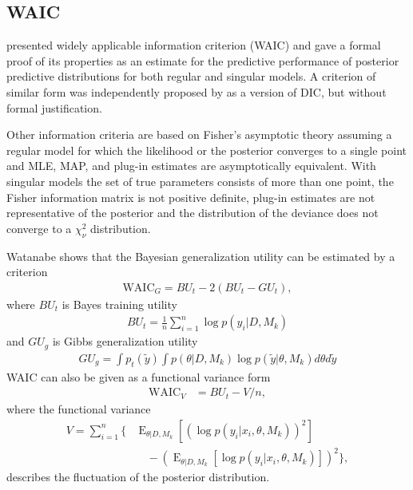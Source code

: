 \documentclass[twoside,11pt]{article}
\def\WAIC{\mathrm{WAIC}}
\DeclareMathOperator{\E}{E}
\begin{document}
\subsection{WAIC}

\citet{Watanabe:2009,Watanabe:2010a,Watanabe:2010d} presented
widely applicable information criterion (WAIC) and gave a formal
proof of its properties as an estimate for the predictive
performance of posterior predictive distributions for both regular
and singular models. A criterion of similar form was independently
proposed by \citet{Richardson:2002} as a version of DIC, but
without formal justification.

Other information criteria are based on Fisher's asymptotic theory
assuming a regular model for which the likelihood or the posterior
converges to a single point and MLE, MAP, and plug-in estimates are
asymptotically equivalent. With singular models the set of true
parameters consists of more than one point, the Fisher information 
matrix is not positive definite, plug-in estimates are not
representative of the posterior and the distribution of the deviance
does not converge to a $\chi^2_\nu$ distribution. 

Watanabe shows that the Bayesian generalization utility can
be estimated by a criterion 
\begin{align}
  \WAIC_G = BU_{t} - 2(BU_{t} - GU_{t}),
\end{align}
where $BU_t$ is Bayes training utility
\begin{align}
  BU_t = \frac{1}{n} \sum_{i=1}^n \log p(y_i|D,M_k) 
\end{align}
and $GU_g$ is Gibbs generalization utility
\begin{align}
  GU_g = \int p_t(\tilde{y}) \int p(\theta|D,M_k) \log
  p(\tilde{y}|\theta,M_k) d\theta d\tilde{y} 
\end{align}
WAIC can also be given as a functional variance form 
\begin{align}
  \WAIC_V &= BU_{t} - V/n,
\end{align}
where the functional variance
\begin{align}
  V = %
  \sum_{i=1}^n \Bigg\{ 
    & \E_{\theta|D,M_k} \left[ \left( 
        \log p({y}_i|{x}_i,\theta,M_k)
      \right)^2 \right] \nonumber \\
    & \quad 
    - \left( 
      \E_{\theta|D,M_k} \left[
        \log p({y}_i|{x}_i,\theta,M_k)
      \right]
    \right)^2
  \Bigg\},
\end{align}
describes the fluctuation of the posterior distribution.
\end{document}
